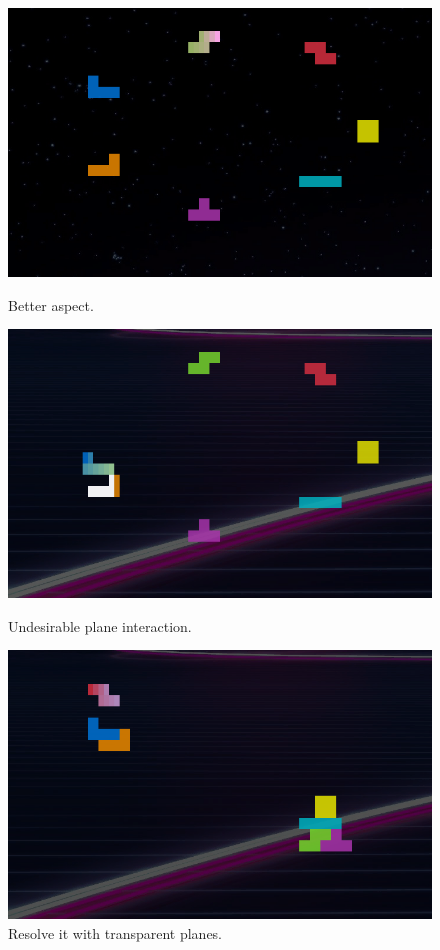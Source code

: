 \begin{figure}[!htbp]
  \begin{minipage}{0.30\textwidth}
    \includegraphics[width=1\linewidth]{media/tetrimino-gradient6.png}
    \caption{Better aspect.}
  \end{minipage}\hfill
  \begin{minipage}{0.30\textwidth}
    \includegraphics[width=1\linewidth]{media/tetrimino-gradient7.png}
    \caption{Undesirable plane interaction.}
    \label{fig:tetrimino-badplane}
  \end{minipage}\hfill
  \begin{minipage}{0.30\textwidth}
    \includegraphics[width=1\linewidth]{media/tetrimino-gradient8.png}
    \caption{Resolve it with transparent planes.}
    \label{fig:tetrimino-trans}
  \end{minipage}\hfill
\end{figure}

